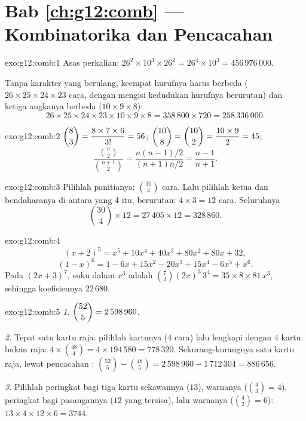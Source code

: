 \section*{Bab \ref{ch:g12:comb} --- Kombinatorika dan Pencacahan}

\begin{solution}{exo:g12:comb:1}
Asas perkalian:
$26^2 \times 10^3 \times 26^2 = 26^4 \times 10^3 = 456\,976\,000$.

Tanpa karakter yang berulang, keempat hurufnya harus berbeda
($26 \times 25 \times 24 \times 23$ cara, dengan mengisi kedudukan hurufnya
berurutan) dan ketiga angkanya berbeda ($10 \times 9 \times 8$):
\[
26 \times 25 \times 24 \times 23 \times 10 \times 9 \times 8
= 358\,800 \times 720 = 258\,336\,000 .
\]
\end{solution}

\begin{solution}{exo:g12:comb:2}
$\dbinom83 = \dfrac{8 \times 7 \times 6}{3!} = 56$;
$\dbinom{10}{8} = \dbinom{10}{2} = \dfrac{10 \times 9}{2} = 45$;
\[
\frac{\binom n2}{\binom{n+1}2}
= \frac{n(n-1)/2}{(n+1)n/2} = \frac{n-1}{n+1}.
\]
\end{solution}

\begin{solution}{exo:g12:comb:3}
Pilihlah panitianya: $\binom{30}{4}$ cara. Lalu pilihlah ketua dan
bendaharanya di antara yang 4 itu, berurutan: $4 \times 3 = 12$ cara. Seluruhnya
\[
\binom{30}{4} \times 12 = 27\,405 \times 12 = 328\,860 .
\]
\end{solution}

\begin{solution}{exo:g12:comb:4}
\[
(x+2)^5 = x^5 + 10x^4 + 40x^3 + 80x^2 + 80x + 32 ,
\]
\[
(1-x)^6 = 1 - 6x + 15x^2 - 20x^3 + 15x^4 - 6x^5 + x^6 .
\]
Pada $(2x+3)^7$, suku dalam $x^3$ adalah
$\binom{7}{3}(2x)^3\,3^4 = 35 \times 8 \times 81\, x^3$, sehingga koefisiennya
$22\,680$.
\end{solution}

\begin{solution}{exo:g12:comb:5}
\emph{1.} $\dbinom{52}{5} = 2\,598\,960$.

\emph{2.} Tepat satu kartu raja: pilihlah kartunya ($4$ cara) lalu lengkapi dengan $4$
kartu bukan raja: $4 \times \binom{48}{4} = 4 \times 194\,580 = 778\,320$.
Sekurang-kurangnya satu kartu raja, lewat pencacahan :
$\binom{52}{5} - \binom{48}{5} = 2\,598\,960 - 1\,712\,304 = 886\,656$.

\emph{3.} Pilihlah peringkat bagi tiga kartu sekawannya ($13$), warnanya
($\binom43 = 4$), peringkat bagi pasangannya ($12$ yang tersisa), lalu warnanya
($\binom42 = 6$):
$13 \times 4 \times 12 \times 6 = 3744$.
\end{solution}

